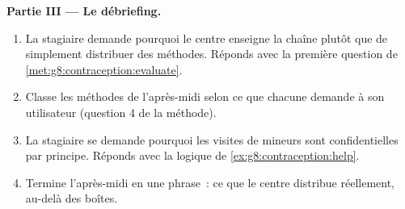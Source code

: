 \begin{problem}
\medskip\noindent\textbf{Partie III --- Le débriefing.}
\begin{enumerate}[resume]
  \item La stagiaire demande pourquoi le centre enseigne la chaîne
        plutôt que de simplement distribuer des méthodes. Réponds
        avec la première question de
        \cref{met:g8:contraception:evaluate}.
  \item Classe les méthodes de l'après-midi selon ce que chacune
        demande à son utilisateur (question 4 de la méthode).
  \item La stagiaire se demande pourquoi les visites de mineurs sont
        confidentielles par principe. Réponds avec la logique de
        \cref{ex:g8:contraception:help}.
  \item Termine l'après-midi en une phrase~: ce que le centre
        distribue réellement, au-delà des boîtes.
\end{enumerate}
\end{problem}
